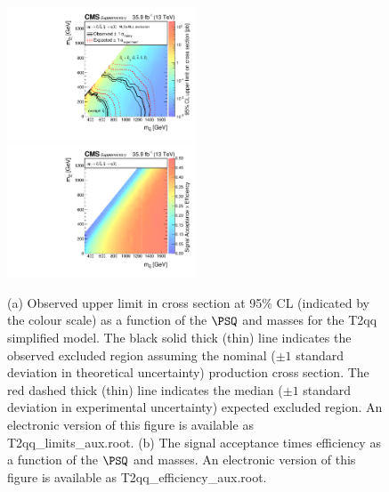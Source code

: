 \begin{figure}
    \begin{center}
            \includegraphics[width=0.50\textwidth]{Supplementary/CMS-SUS-16-038_Figure-aux_021-a}
            \includegraphics[width=0.50\textwidth]{Supplementary/CMS-SUS-16-038_Figure-aux_021-b}
        \caption{ (a) Observed upper limit in cross section at 95\% CL (indicated
        by the colour scale) as a function of 
        the $\PSQ$ and \PSGczDo %
        masses for the 
        T2qq %
        simplified  model.  The  black  solid thick  (thin)  line indicates  the
        observed  excluded  region  assuming   the  nominal  (${\pm}1$  standard
        deviation in theoretical uncertainty)  production cross section. The red
        dashed  thick  (thin)  line  indicates  the  median  (${\pm}1$  standard
        deviation in experimental uncertainty) expected excluded region.
    An electronic version of this figure is available as T2qq\_limits\_aux.root.
        (b) The signal acceptance times efficiency as a function of 
        the $\PSQ$ and \PSGczDo %
        masses.
    An electronic version of this figure is available as T2qq\_efficiency\_aux.root.
        }
        \label{fig:T2qq}
    \end{center}
\end{figure}

